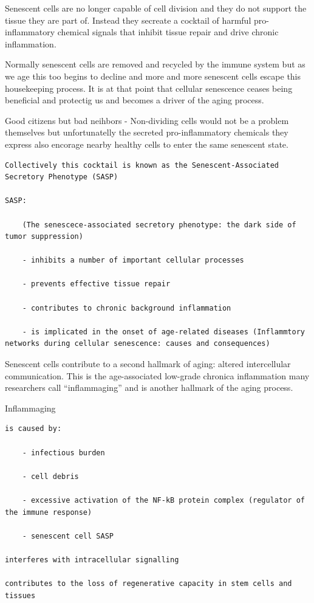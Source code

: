 \documentclass[
]{book}
\begin{document}
Senescent cells are no longer capable of cell division and they do not support the tissue they are part of. Instead they secreate a cocktail of harmful pro-inflammatory chemical signals that inhibit tissue repair and drive chronic inflammation.

Normally senescent cells are removed and recycled by the immune system but as we age this too begins to decline and more and more senescent cells escape this housekeeping process. It is at that point that cellular senescence ceases being beneficial and protectig us and becomes a driver of the aging process.

Good citizens but bad neihbors - Non-dividing cells would not be a problem themselves but unfortunatelly the secreted pro-inflammatory chemicals they express also encorage nearby healthy cells to enter the same senescent state.

\begin{verbatim}
Collectively this cocktail is known as the Senescent-Associated Secretory Phenotype (SASP)

SASP:

    (The senescece-associated secretory phenotype: the dark side of tumor suppression)

    - inhibits a number of important cellular processes

    - prevents effective tissue repair

    - contributes to chronic background inflammation

    - is implicated in the onset of age-related diseases (Inflammtory networks during cellular senescence: causes and consequences)
\end{verbatim}

Senescent cells contribute to a second hallmark of aging: altered intercellular communication. This is the age-associated low-grade chronica inflammation many researchers call ``inflammaging'' and is another hallmark of the aging process.

Inflammaging

\begin{verbatim}
is caused by:

    - infectious burden

    - cell debris

    - excessive activation of the NF-kB protein complex (regulator of the immune response)

    - senescent cell SASP

interferes with intracellular signalling

contributes to the loss of regenerative capacity in stem cells and tissues
\end{verbatim}
\end{document}
